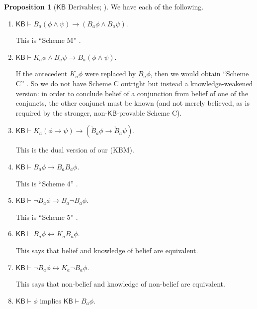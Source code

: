 \documentclass[12pt]{article}
\theoremstyle{definition}
\newtheorem{proposition}[theorem]{Proposition}
\newcommand{\KB}{{\mathsf{KB}}}                        %
\begin{document}
\begin{proposition}[$\KB$ Derivables; \cite{EijRen14:BEPL}]
  \label{prop:KBgt-derivables}
  We have each of the following.
  \begin{enumerate}
  \item $\KB\vdash B_a(\phi\land\psi)\to(B_a\phi\land B_a\psi)$.
    \label{derivables:Band-andB}

    This is ``Scheme M'' \cite[Ch.~8]{Chellas:ml}.

  \item $\KB\vdash K_a\phi\land B_a\psi\to B_a(\phi\land\psi)$.
    \label{derivables:andB-Band}

    If the antecedent $K_a\phi$ were replaced by $B_a\phi$, then we
    would obtain ``Scheme C'' \cite[Ch.~8]{Chellas:ml}.  So we do not
    have Scheme C outright but instead a knowledge-weakened version:
    in order to conclude belief of a conjunction from belief of one of
    the conjuncts, the other conjunct must be known (and not merely
    believed, as is required by the stronger, non-$\KB$-provable
    Scheme C).

  \item $\KB\vdash K_a(\phi\to\psi)\to(\check B_a\phi\to\check B_a\psi)$.
    \label{derivables:check-M}

    This is the dual version of our (KBM).

    \item $\KB\vdash B_a\phi\to B_aB_a\phi$.
    \label{derivables:pos-belief}

    This is ``Scheme 4'' \cite[Ch.~8]{Chellas:ml}.

  \item $\KB\vdash \lnot B_a\phi\to B_a\lnot B_a\phi$.
    \label{derivables:neg-belief}

    This is ``Scheme 5'' \cite[Ch.~8]{Chellas:ml}.

  \item $\KB\vdash B_a\phi\leftrightarrow K_aB_a\phi$.
    \label{derivables:B-KB}

    This says that belief and knowledge of belief are equivalent.

  \item $\KB\vdash \lnot B_a\phi\leftrightarrow K_a\lnot B_a\phi$.
    \label{derivables:nB-KnB}

    This says that non-belief and knowledge of non-belief are equivalent.

  \item $\KB\vdash\phi$ implies $\KB\vdash B_a\phi$.
    \label{derivables:B-nec}


\end{enumerate}
\end{proposition}
\end{document}

